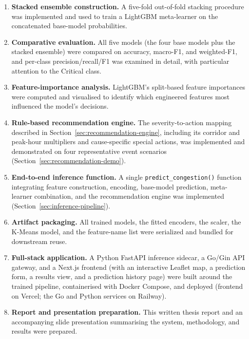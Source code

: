\begin{enumerate}
\item \textbf{Stacked ensemble construction.} A five-fold out-of-fold stacking procedure was implemented and used to train a LightGBM meta-learner on the concatenated base-model probabilities.
\item \textbf{Comparative evaluation.} All five models (the four base models plus the stacked ensemble) were compared on accuracy, macro-F1, and weighted-F1, and per-class precision/recall/F1 was examined in detail, with particular attention to the Critical class.
\item \textbf{Feature-importance analysis.} LightGBM's split-based feature importances were computed and visualised to identify which engineered features most influenced the model's decisions.
\item \textbf{Rule-based recommendation engine.} The severity-to-action mapping described in Section~\ref{sec:recommendation-engine}, including its corridor and peak-hour multipliers and cause-specific special actions, was implemented and demonstrated on four representative event scenarios (Section~\ref{sec:recommendation-demo}).
\item \textbf{End-to-end inference function.} A single \texttt{predict\_congestion()} function integrating feature construction, encoding, base-model prediction, meta-learner combination, and the recommendation engine was implemented (Section~\ref{sec:inference-pipeline}).
\item \textbf{Artifact packaging.} All trained models, the fitted encoders, the scaler, the K-Means model, and the feature-name list were serialized and bundled for downstream reuse.
\item \textbf{Full-stack application.} A Python FastAPI inference sidecar, a Go/Gin API gateway, and a Next.js frontend (with an interactive Leaflet map, a prediction form, a results view, and a prediction history page) were built around the trained pipeline, containerised with Docker Compose, and deployed (frontend on Vercel; the Go and Python services on Railway).
\item \textbf{Report and presentation preparation.} This written thesis report and an accompanying slide presentation summarising the system, methodology, and results were prepared.
\end{enumerate}
